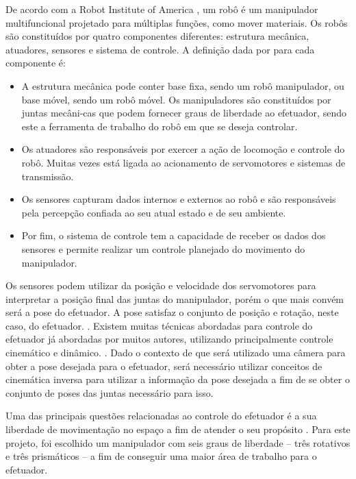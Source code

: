 De acordo com a Robot Institute of America \cite{baturone2005robotica}, um robô é um manipulador multifuncional projetado para múltiplas funções, como mover materiais. Os robôs são constituídos por quatro componentes diferentes: estrutura mecânica, atuadores, sensores e sistema de controle. A definição dada por \cite{siciliano2010robotics} para cada componente é:

\begin{itemize}
  \item A estrutura mecânica pode conter base fixa, sendo um robô manipulador, ou base móvel, sendo um robô móvel. Os manipuladores são constituídos por juntas mecâni-cas que podem fornecer graus de liberdade ao efetuador, sendo este a ferramenta de trabalho do robô em que se deseja controlar.
  \item Os atuadores são responsáveis por exercer a ação de locomoção e controle do robô. Muitas vezes está ligada ao acionamento de servomotores e sistemas de transmissão.
  \item Os sensores capturam dados internos e externos ao robô e são responsáveis pela percepção confiada ao seu atual estado e de seu ambiente.
  \item Por fim, o sistema de controle tem a capacidade de receber os dados dos sensores e permite realizar um controle planejado do movimento do manipulador.
\end{itemize}

Os sensores podem utilizar da posição e velocidade dos servomotores para interpretar a posição final das juntas do manipulador, porém o que mais convém será a pose do efetuador. A pose satisfaz o conjunto de posição e rotação, neste caso, do efetuador. \cite{siciliano2010robotics}. Existem muitas técnicas abordadas para controle do efetuador já abordadas por muitos autores, utilizando principalmente controle cinemático e dinâmico. \cite{guimaraes_batista_modelo_2019}. Dado o contexto de que será utilizado uma câmera para obter a pose desejada para o efetuador, será necessário utilizar conceitos de cinemática inversa para utilizar a informação da pose desejada a fim de se obter o conjunto de poses das juntas necessário para isso.
   
Uma das principais questões relacionadas ao controle do efetuador é a sua liberdade de movimentação no espaço a fim de atender o seu propósito \cite{bretherton1999effective}. Para este projeto, foi escolhido um manipulador com seis graus de liberdade – três rotativos e três prismáticos – a fim de conseguir uma maior área de trabalho para o efetuador.


